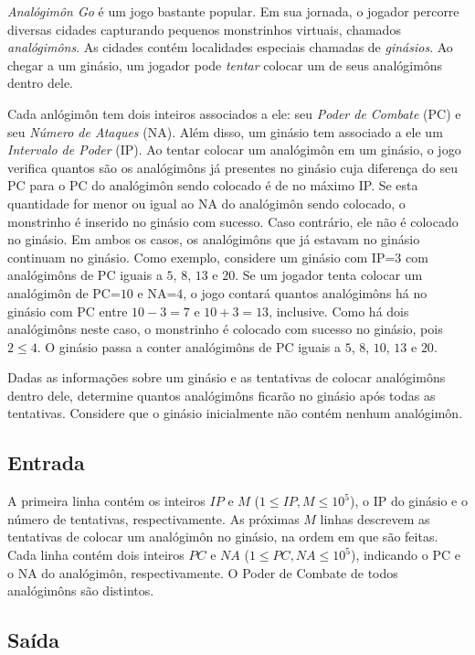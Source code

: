 \textit{Analógimôn Go} é um jogo bastante popular. Em sua jornada, o jogador percorre diversas
cidades capturando pequenos monstrinhos virtuais, chamados \textit{analógimôns}.
As cidades contém localidades especiais chamadas de
\textit{ginásios}. Ao chegar a um ginásio, um jogador pode \textit{tentar}
colocar um de seus analógimôns dentro dele.

Cada anlógimôn tem dois inteiros associados a ele: seu \textit{Poder de Combate}
(PC) e seu \textit{Número de Ataques} (NA). Além disso, um ginásio tem associado
a ele um \textit{Intervalo de Poder} (IP). Ao tentar colocar um
analógimôn em um ginásio, o jogo verifica quantos são os analógimôns já
presentes no ginásio cuja diferença do seu PC para o PC do analógimôn sendo
colocado é de no máximo IP. Se esta quantidade for menor ou igual
ao NA do analógimôn sendo colocado, o monstrinho é inserido no ginásio com
sucesso. Caso contrário, ele não é colocado no ginásio.
Em ambos os casos, os analógimôns que já estavam no ginásio
continuam no ginásio.
Como exemplo, considere um ginásio com IP=$3$ com analógimôns de PC iguais a
$5$, $8$,
$13$ e $20$. Se um jogador tenta colocar um analógimôn de PC=$10$ e NA=$4$, o jogo
contará quantos analógimôns há no ginásio com PC entre $10-3 = 7$ e $10+3 = 13$,
inclusive. Como há dois analógimôns neste caso, o monstrinho é colocado com
sucesso no ginásio, pois $2 \leq 4$. O ginásio passa a conter analógimôns de PC
iguais a $5$, $8$, $10$, $13$ e $20$.

Dadas as informações sobre um ginásio e as tentativas de colocar analógimôns
dentro dele, determine quantos analógimôns ficarão no ginásio após todas as
tentativas. Considere que o ginásio inicialmente não contém nenhum analógimôn.

\subsection*{Entrada}

A primeira linha contém os inteiros $IP$ e $M$ ($1 \leq IP, M \leq 10^5$), o
IP do ginásio e o número de tentativas, respectivamente.
As próximas $M$ linhas descrevem as tentativas de colocar um analógimôn no
ginásio, na ordem em que são feitas. Cada linha contém dois inteiros $PC$ e $NA$
($1 \leq PC, NA \leq 10^5$), indicando o PC e o NA
do analógimôn, respectivamente. O Poder de Combate de todos analógimôns são
distintos.

\subsection*{Saída}

